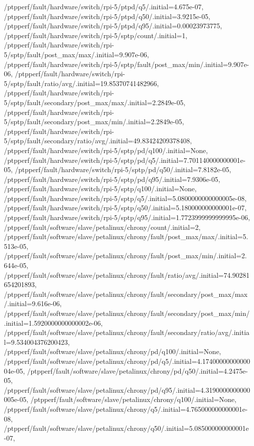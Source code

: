 {    /ptpperf/fault/hardware/switch/rpi-5/ptpd/q5/.initial=4.675e-07,
    /ptpperf/fault/hardware/switch/rpi-5/ptpd/q50/.initial=3.9215e-05,
    /ptpperf/fault/hardware/switch/rpi-5/ptpd/q95/.initial=0.00023973775,
    /ptpperf/fault/hardware/switch/rpi-5/sptp/count/.initial=1,
    /ptpperf/fault/hardware/switch/rpi-5/sptp/fault/post_max/max/.initial=9.907e-06,
    /ptpperf/fault/hardware/switch/rpi-5/sptp/fault/post_max/min/.initial=9.907e-06,
    /ptpperf/fault/hardware/switch/rpi-5/sptp/fault/ratio/avg/.initial=19.85370741482966,
    /ptpperf/fault/hardware/switch/rpi-5/sptp/fault/secondary/post_max/max/.initial=2.2849e-05,
    /ptpperf/fault/hardware/switch/rpi-5/sptp/fault/secondary/post_max/min/.initial=2.2849e-05,
    /ptpperf/fault/hardware/switch/rpi-5/sptp/fault/secondary/ratio/avg/.initial=49.83424209378408,
    /ptpperf/fault/hardware/switch/rpi-5/sptp/pd/q100/.initial=None,
    /ptpperf/fault/hardware/switch/rpi-5/sptp/pd/q5/.initial=7.701140000000001e-05,
    /ptpperf/fault/hardware/switch/rpi-5/sptp/pd/q50/.initial=7.8182e-05,
    /ptpperf/fault/hardware/switch/rpi-5/sptp/pd/q95/.initial=7.9306e-05,
    /ptpperf/fault/hardware/switch/rpi-5/sptp/q100/.initial=None,
    /ptpperf/fault/hardware/switch/rpi-5/sptp/q5/.initial=5.0800000000000005e-08,
    /ptpperf/fault/hardware/switch/rpi-5/sptp/q50/.initial=5.180000000000001e-07,
    /ptpperf/fault/hardware/switch/rpi-5/sptp/q95/.initial=1.7723999999999995e-06,
    /ptpperf/fault/software/slave/petalinux/chrony/count/.initial=2,
    /ptpperf/fault/software/slave/petalinux/chrony/fault/post_max/max/.initial=5.513e-05,
    /ptpperf/fault/software/slave/petalinux/chrony/fault/post_max/min/.initial=2.644e-05,
    /ptpperf/fault/software/slave/petalinux/chrony/fault/ratio/avg/.initial=74.90281654201893,
    /ptpperf/fault/software/slave/petalinux/chrony/fault/secondary/post_max/max/.initial=9.616e-06,
    /ptpperf/fault/software/slave/petalinux/chrony/fault/secondary/post_max/min/.initial=1.5920000000000002e-06,
    /ptpperf/fault/software/slave/petalinux/chrony/fault/secondary/ratio/avg/.initial=9.534004376200423,
    /ptpperf/fault/software/slave/petalinux/chrony/pd/q100/.initial=None,
    /ptpperf/fault/software/slave/petalinux/chrony/pd/q5/.initial=4.1740000000000004e-05,
    /ptpperf/fault/software/slave/petalinux/chrony/pd/q50/.initial=4.2475e-05,
    /ptpperf/fault/software/slave/petalinux/chrony/pd/q95/.initial=4.3190000000000005e-05,
    /ptpperf/fault/software/slave/petalinux/chrony/q100/.initial=None,
    /ptpperf/fault/software/slave/petalinux/chrony/q5/.initial=4.765000000000001e-08,
    /ptpperf/fault/software/slave/petalinux/chrony/q50/.initial=5.085000000000001e-07,
}
